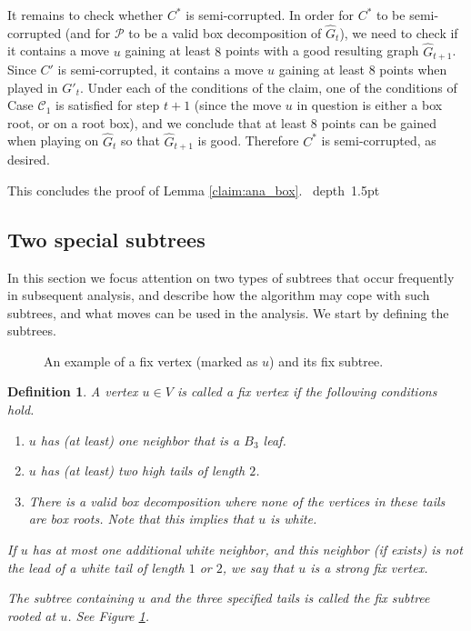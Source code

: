 \documentclass[11pt]{article}
\def\blackslug{\hbox{\hskip 1pt \vrule width 4pt height 8pt
    depth 1.5pt \hskip 1pt}}
\def\QED{\quad\blackslug\lower 8.5pt\null\par}
\def\dnsitem{\vspace{-7pt}\item}
\newtheorem{definition}[theorem]{Definition}
\theoremstyle{definition}
\def\boxpropnocorhigh{\mathcal{C}_1}
\begin{document}
It remains to check whether $C^*$ is semi-corrupted.
In order for $C^*$ to be semi-corrupted (and for $\mathcal{P}$ to be a valid box decomposition of $\hat{G}_t$), we need to check if it contains a move $u$ gaining at least $8$ points with a good resulting graph $\hat{G}_{t+1}$.
Since $C'$ is semi-corrupted, it contains a move $u$ gaining at least $8$ points when played in $G'_t$.
Under each of the conditions of the claim, one of the conditions of Case $\boxpropnocorhigh$ is satisfied for step $t+1$ (since the move $u$ in question is either a box root, or on a root box), and we conclude that at least $8$ points can be gained when playing on $\hat{G}_{t}$ so that $\hat{G}_{t+1}$ is good. Therefore $C^*$ is semi-corrupted, as desired.

This concludes the proof of Lemma \ref{claim:ana_box}.
\QED

\subsection{Two special subtrees}
\label{sub:special_subtrees}

In this section we focus attention on two types of subtrees that occur frequently in subsequent analysis, 
and describe how the algorithm may cope with such subtrees, and what moves can be used in the analysis.
We start by defining the subtrees.

\begin{figure}[thbp]
  \caption{\sf An example of a fix vertex (marked as $u$) and its fix subtree.}
  \medskip
  \centering
  \label{fig:tu_vertex}
\end{figure}
\begin{definition}
A vertex $u \in V$ is called a \emph{fix} vertex if the following conditions hold.
\begin{enumerate}
	\dnsitem $u$ has (at least) one neighbor that is a $B_3$ leaf.
	\dnsitem $u$ has (at least) two high tails of length $2$.
	\dnsitem There is a valid box decomposition where none of the vertices in these tails are box roots. 
		Note that this implies that $u$ is white.
\end{enumerate}
If $u$ has at most one additional white neighbor, and this neighbor (if exists) is not the lead of a white tail of length $1$ or $2$, 
we say that $u$ is a \emph{strong fix} vertex. 

The subtree containing $u$ and the three specified tails is called the \emph{fix subtree rooted at $u$}.
See Figure \ref{fig:tu_vertex}.
\end{definition}
\end{document}
